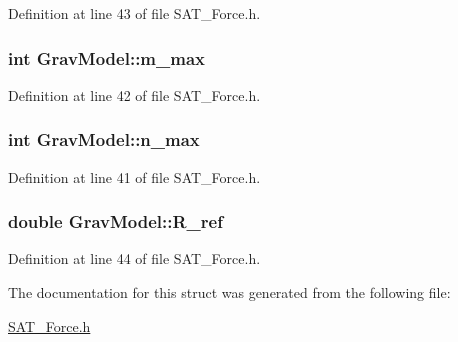 Definition at line 43 of file S\-A\-T\-\_\-\-Force.\-h.

\hypertarget{structGravModel_a77ed9c234c938a6ebb239df2174df476}{
\subsubsection[{m\-\_\-max}]{\setlength{\rightskip}{0pt plus 5cm}int Grav\-Model\-::m\-\_\-max}}\label{structGravModel_a77ed9c234c938a6ebb239df2174df476}


Definition at line 42 of file S\-A\-T\-\_\-\-Force.\-h.

\hypertarget{structGravModel_a2523255eb438cc2d4d7166d01abbb805}{
\subsubsection[{n\-\_\-max}]{\setlength{\rightskip}{0pt plus 5cm}int Grav\-Model\-::n\-\_\-max}}\label{structGravModel_a2523255eb438cc2d4d7166d01abbb805}


Definition at line 41 of file S\-A\-T\-\_\-\-Force.\-h.

\hypertarget{structGravModel_ad1690c2e76a4b250fa68a42ebc495cec}{
\subsubsection[{R\-\_\-ref}]{\setlength{\rightskip}{0pt plus 5cm}double Grav\-Model\-::\-R\-\_\-ref}}\label{structGravModel_ad1690c2e76a4b250fa68a42ebc495cec}


Definition at line 44 of file S\-A\-T\-\_\-\-Force.\-h.



The documentation for this struct was generated from the following file\-:\begin{DoxyCompactItemize}
\item 
\hyperlink{SAT__Force_8h}{S\-A\-T\-\_\-\-Force.\-h}\end{DoxyCompactItemize}
